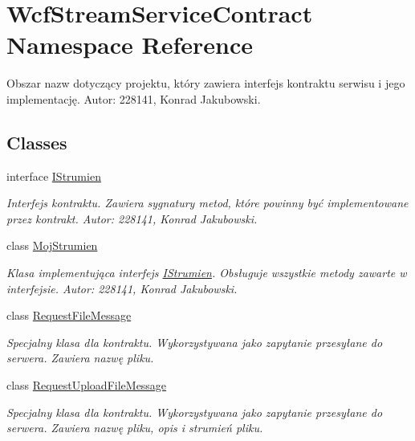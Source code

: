 \hypertarget{namespace_wcf_stream_service_contract}{}\section{Wcf\+Stream\+Service\+Contract Namespace Reference}
\label{namespace_wcf_stream_service_contract}


Obszar nazw dotyczący projektu, który zawiera interfejs kontraktu serwisu i jego implementację. Autor\+: 228141, Konrad Jakubowski.  


\subsection*{Classes}
\begin{DoxyCompactItemize}
\item 
interface \hyperlink{interface_wcf_stream_service_contract_1_1_i_strumien}{I\+Strumien}
\begin{DoxyCompactList}\small\item\em Interfejs kontraktu. Zawiera sygnatury metod, które powinny być implementowane przez kontrakt. Autor\+: 228141, Konrad Jakubowski. \end{DoxyCompactList}\item 
class \hyperlink{class_wcf_stream_service_contract_1_1_moj_strumien}{Moj\+Strumien}
\begin{DoxyCompactList}\small\item\em Klasa implementująca interfejs \textquotesingle{}\hyperlink{interface_wcf_stream_service_contract_1_1_i_strumien}{I\+Strumien}\textquotesingle{}. Obsługuje wszystkie metody zawarte w interfejsie. Autor\+: 228141, Konrad Jakubowski. \end{DoxyCompactList}\item 
class \hyperlink{class_wcf_stream_service_contract_1_1_request_file_message}{Request\+File\+Message}
\begin{DoxyCompactList}\small\item\em Specjalny klasa dla kontraktu. Wykorzystywana jako zapytanie przesyłane do serwera. Zawiera nazwę pliku. \end{DoxyCompactList}\item 
class \hyperlink{class_wcf_stream_service_contract_1_1_request_upload_file_message}{Request\+Upload\+File\+Message}
\begin{DoxyCompactList}\small\item\em Specjalny klasa dla kontraktu. Wykorzystywana jako zapytanie przesyłane do serwera. Zawiera nazwę pliku, opis i strumień pliku. \end{DoxyCompactList}\item 

\end{DoxyCompactItemize}
